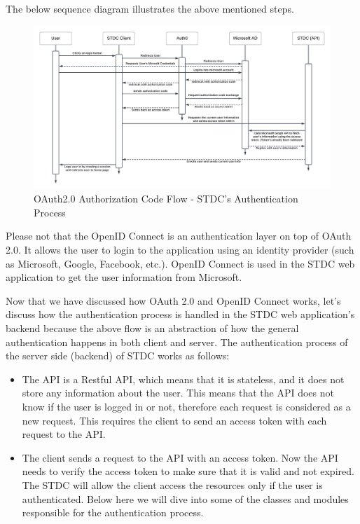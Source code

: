 \begin{justify}
        \vspace{0.25cm}
        \newendline The below sequence diagram illustrates the above mentioned steps.


        \begin{figure}[H]
            \centerline{\includegraphics[width=150mm,scale=1]{figures/implementation_and_testing/implementation/backend/STDC Authentication.png}}
            \caption{OAuth2.0 Authorization Code Flow - STDC's Authentication Process}
        \end{figure}
    
    
        \vspace{-0.25cm}
        \newendline Please not that the OpenID Connect is an authentication layer on top of OAuth 2.0. It allows the user to login to the application using an identity provider (such as Microsoft, Google, Facebook, etc.). OpenID Connect is used in the STDC web application to get the user information from Microsoft.
    
        \vspace{0.25cm}
        \newendline Now that we have discussed how OAuth 2.0 and OpenID Connect works, let's discuss how the authentication process is handled in the STDC web application's backend because the above flow is an abstraction of how the general authentication happens in both client and server. The authentication process of the server side (backend) of STDC works as follows:
        
            
        \begin{itemize}
        \item The API is a Restful API, which means that it is stateless, and it does not store any information about the user. This means that the API does not know if the user is logged in or not, therefore each request is considered as a new request. This requires the client to send an access token with each request to the API.
        \item The client sends a request to the API with an access token. Now the API needs to verify the access token to make sure that it is valid and not expired. The STDC will allow the client access the resources only if the user is authenticated. Below here we will dive into some of the classes and modules responsible for the authentication process.\\
        

\end{itemize}
\end{justify}
